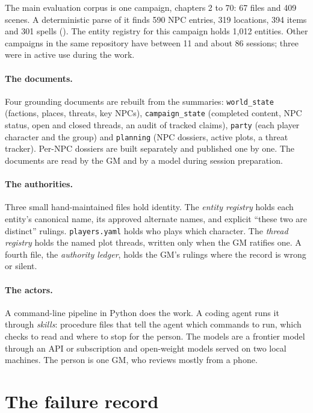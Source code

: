 \documentclass[11pt]{article}
\newcommand{\code}[1]{\texttt{#1}}
\begin{document}
The main evaluation corpus is one campaign, chapters 2 to 70: 67 files and 409 scenes.
A deterministic parse of it finds 590 NPC entries, 319 locations, 394 items and 301
spells (). The entity registry
for this campaign holds 1{,}012 entities. Other campaigns in the same repository have
between 11 and about 86 sessions; three were in active use during the work.

\paragraph{The documents.} Four grounding documents are rebuilt from the summaries:
\code{world\_state} (factions, places, threats, key NPCs), \code{campaign\_state}
(completed content, NPC status, open and closed threads, an audit of tracked claims),
\code{party} (each player character and the group) and \code{planning} (NPC dossiers,
active plots, a threat tracker). Per-NPC dossiers are built separately and published one
by one. The documents are read by the GM and by a model during session preparation.

\paragraph{The authorities.} Three small hand-maintained files hold identity. The
\emph{entity registry} holds each entity's canonical name, its approved alternate names,
and explicit ``these two are distinct'' rulings. \code{players.yaml} holds who plays
which character. The \emph{thread registry} holds the named plot threads, written only
when the GM ratifies one. A fourth file, the \emph{authority ledger}, holds the GM's
rulings where the record is wrong or silent.

\paragraph{The actors.} A command-line pipeline in Python does the work. A coding agent
runs it through \emph{skills}: procedure files that tell the agent which commands to
run, which checks to read and where to stop for the person. The models are a frontier
model through an API or subscription and open-weight models served on two local
machines. The person is one GM, who reviews mostly from a phone.

\section{The failure record}
\label{sec:failures}
\end{document}
